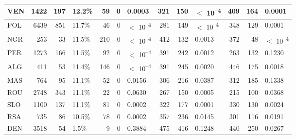 \begin{tabular}{l|r|r|l|r|r|l|r|r|l|r|r|l}
\hline
VEN & 1422 & 197 & 12.2\% & 59 & 0 & 0.0003 & 321 & 150 & $<$ 10\textsuperscript{--4} & 409 & 164 & 0.0001\\
\hline
POL & 6439 & 851 & 11.7\% & 46 & 0 & $<$ 10\textsuperscript{--4} & 281 & 149 & $<$ 10\textsuperscript{--4} & 348 & 129 & 0.0001\\
\hline
NGR & 253 & 33 & 11.5\% & 210 & 0 & $<$ 10\textsuperscript{--4} & 412 & 132 & 0.0013 & 372 & 48 & $<$ 10\textsuperscript{--4}\\
\hline
PER & 1273 & 166 & 11.5\% & 92 & 0 & $<$ 10\textsuperscript{--4} & 391 & 242 & 0.0012 & 263 & 132 & 0.1230\\
\hline
ALG & 411 & 53 & 11.4\% & 146 & 0 & $<$ 10\textsuperscript{--4} & 391 & 245 & 0.0020 & 446 & 175 & 0.0018\\
\hline
MAS & 764 & 95 & 11.1\% & 52 & 0 & 0.0156 & 306 & 216 & 0.0387 & 312 & 185 & 0.1338\\
\hline
ROU & 2748 & 343 & 11.1\% & 22 & 0 & 0.0630 & 267 & 150 & 0.0005 & 215 & 100 & 0.0368\\
\hline
SLO & 1100 & 137 & 11.1\% & 81 & 0 & 0.0002 & 322 & 177 & 0.0001 & 330 & 130 & 0.0024\\
\hline
RSA & 735 & 86 & 10.5\% & 78 & 0 & 0.0002 & 357 & 236 & 0.0145 & 301 & 116 & 0.0191\\
\hline
DEN & 3518 & 54 & 1.5\% & 9 & 0 & 0.3884 & 475 & 416 & 0.1248 & 440 & 250 & 0.0267\\
\hline
\end{tabular}
